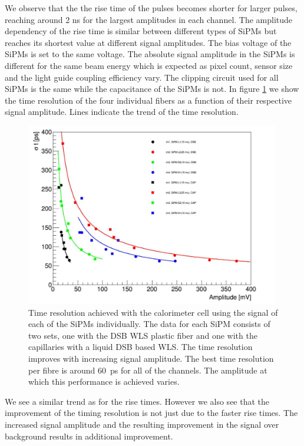 %
We observe that the the rise time of the pulses becomes shorter for larger pulses, 
reaching around 2 ns for the largest amplitudes in each channel. 
The amplitude dependency of the rise time is similar between different types of SiPMs but 
reaches its shortest value at different signal amplitudes. 
The bias voltage of the SiPMs is set to the same voltage. The absolute signal amplitude in the SiPMs is 
different for the same beam energy which is expected as pixel count, sensor size and the light guide coupling 
efficiency vary. The clipping circuit used for all SiPMs is the same while the capacitance 
of the  SiPMs is not. In figure \ref{TimeResolution} we show the time resolution of the four individual 
fibers as a function of their respective signal amplitude. Lines indicate the trend of the time resolution.
%
\begin{figure}[htbc]
\includegraphics[width=0.99\textwidth]{SH_timing_SiPM.pdf}
\caption{\label{TimeResolution} Time resolution achieved with the calorimeter cell using the signal of each 
of the  SiPMs individually. The data for each SiPM consists of two sets, one with the DSB WLS plastic fiber and one with 
the capillaries with a liquid DSB based WLS. The time resolution improves with increasing signal amplitude. The best time 
resolution per fibre is around $60$~ps for all of the channels. The amplitude at which this performance is achieved varies.}
\end{figure}
%
We see a similar trend as for the rise times. However we also see that the improvement of the timing resolution is 
not just due to the faster rise times. The increased signal amplitude and the resulting improvement in the signal over 
background results in additional improvement.

